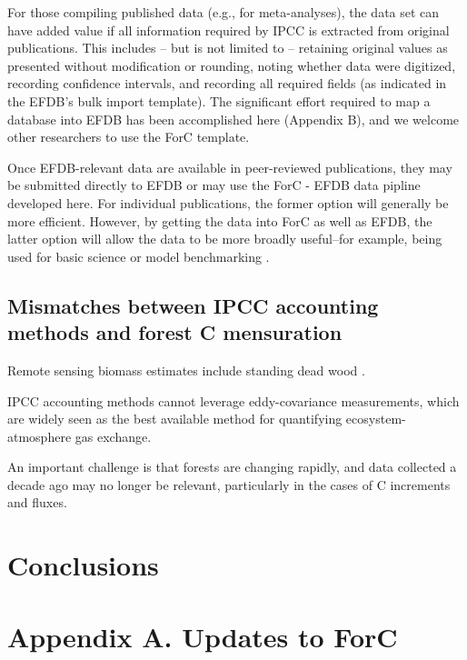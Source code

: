 \documentclass[, manuscript]{copernicus}
\begin{document}
For those compiling published data (e.g., for meta-analyses), the data
set can have added value if all information required by IPCC is
extracted from original publications. This includes -- but is not
limited to -- retaining original values as presented without
modification or rounding, noting whether data were digitized, recording
confidence intervals, and recording all required fields (as indicated in
the EFDB's bulk import template). The significant effort required to map
a database into EFDB has been accomplished here (Appendix B), and we
welcome other researchers to use the ForC template.

Once EFDB-relevant data are available in peer-reviewed publications,
they may be submitted directly to EFDB or may use the ForC - EFDB data
pipline developed here. For individual publications, the former option
will generally be more efficient. However, by getting the data into ForC
as well as EFDB, the latter option will allow the data to be more
broadly useful--for example, being used for basic science
\citep[e.g.,][]{banburymorgan_global_2021, anderson-teixeira_carbon_2021}
or model benchmarking \citep{fer_ecosystem_2021}.

\subsection{Mismatches between IPCC accounting methods and forest C
mensuration}

Remote sensing biomass estimates include standing dead wood
\citep{duncanson_aboveground_2021}.

IPCC accounting methods cannot leverage eddy-covariance measurements,
which are widely seen as the best available method for quantifying
ecosystem-atmosphere gas exchange.

An important challenge is that forests are changing rapidly, and data
collected a decade ago may no longer be relevant, particularly in the
cases of C increments and fluxes.

\section{Conclusions}

\clearpage

\section*{Appendix A. Updates to ForC}
\end{document}
